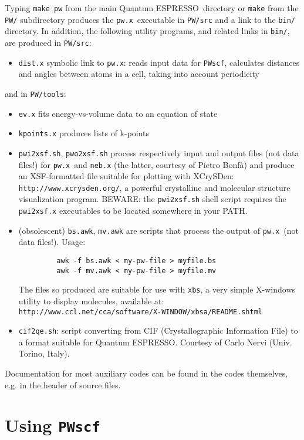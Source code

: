 \documentclass[12pt,a4paper]{article}
\def\PWscf{\texttt{PWscf}}
\def\qe{{\sc Quantum ESPRESSO}}
\def\pwx{\texttt{pw.x}}
\begin{document}
Typing \texttt{make pw} from the main \qe\ directory or
\texttt{make} from the \texttt{PW/} subdirectory produces
the \pwx\ executable in \texttt{PW/src} and a link to the
\texttt{bin/} directory. In addition, the following utility
programs, and related links in \texttt{bin/}, are produced
in \texttt{PW/src}:
\begin{itemize}
\item  \texttt{dist.x} symbolic link to \pwx: reads input data for \PWscf,
calculates distances and angles between atoms in a cell,
taking into account periodicity
\end{itemize}
and in \texttt{PW/tools}:
\begin{itemize}
\item  \texttt{ev.x} fits energy-vs-volume data to an equation of state
\item  \texttt{kpoints.x} produces lists of k-points
\item  \texttt{pwi2xsf.sh},  \texttt{pwo2xsf.sh} process respectively 
  input and output files (not data files!) for \pwx\ and \texttt{neb.x} 
  (the latter, courtesy of Pietro Bonf\`a) and produce an XSF-formatted file
  suitable for plotting with XCrySDen:
  \texttt{http://www.xcrysden.org/}, a powerful crystalline and
  molecular structure visualization program.
  BEWARE: the  \texttt{pwi2xsf.sh} shell script requires the
  \texttt{pwi2xsf.x} executables to be located somewhere in your PATH. 
\item (obsolescent) \texttt{bs.awk},  \texttt{mv.awk} are scripts that
  process the output of \pwx\ (not data files!). Usage: 
\begin{verbatim}
         awk -f bs.awk < my-pw-file > myfile.bs
         awk -f mv.awk < my-pw-file > myfile.mv
\end{verbatim}
The files so produced are suitable for use with  \texttt{xbs}, a very simple
X-windows utility to display molecules, available at:\\
 \texttt{http://www.ccl.net/cca/software/X-WINDOW/xbsa/README.shtml}
\item  \texttt{cif2qe.sh}: script converting from CIF 
(Crystallographic Information File) to a format suitable for \qe.
Courtesy of Carlo Nervi (Univ. Torino, Italy).
\end{itemize}
Documentation for most auxiliary codes can be found in the codes
themselves, e.g. in the header of source files.

\newpage\section{Using \PWscf}
\end{document}
